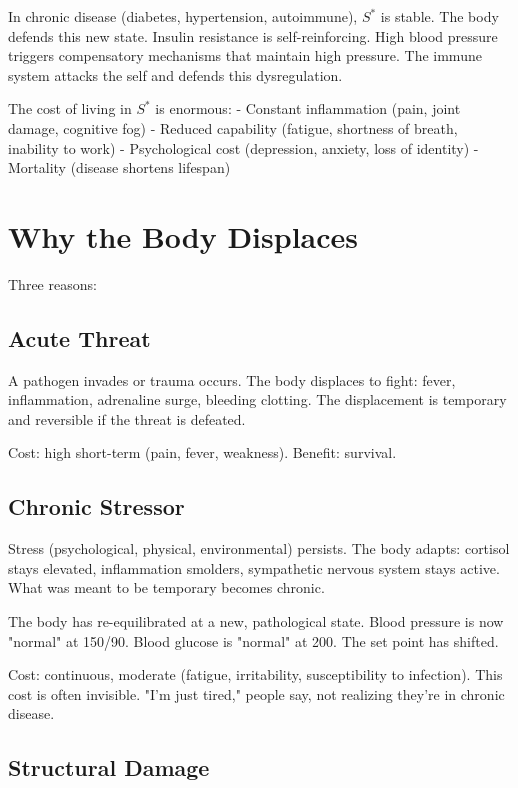 \documentclass[12pt]{article}
\begin{document}
In chronic disease (diabetes, hypertension, autoimmune), $S^*$ is stable. The body defends this new state. Insulin resistance is self-reinforcing. High blood pressure triggers compensatory mechanisms that maintain high pressure. The immune system attacks the self and defends this dysregulation.

The cost of living in $S^*$ is enormous:
- Constant inflammation (pain, joint damage, cognitive fog)
- Reduced capability (fatigue, shortness of breath, inability to work)
- Psychological cost (depression, anxiety, loss of identity)
- Mortality (disease shortens lifespan)

\section{Why the Body Displaces}

Three reasons:

\subsection{Acute Threat}

A pathogen invades or trauma occurs. The body displaces to fight: fever, inflammation, adrenaline surge, bleeding clotting. The displacement is temporary and reversible if the threat is defeated.

Cost: high short-term (pain, fever, weakness). Benefit: survival.

\subsection{Chronic Stressor}

Stress (psychological, physical, environmental) persists. The body adapts: cortisol stays elevated, inflammation smolders, sympathetic nervous system stays active. What was meant to be temporary becomes chronic.

The body has re-equilibrated at a new, pathological state. Blood pressure is now "normal" at 150/90. Blood glucose is "normal" at 200. The set point has shifted.

Cost: continuous, moderate (fatigue, irritability, susceptibility to infection). This cost is often invisible. "I'm just tired," people say, not realizing they're in chronic disease.

\subsection{Structural Damage}
\end{document}
